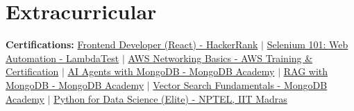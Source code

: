 \documentclass[letterpaper,11pt]{article}
\begin{document}
  \section{Extracurricular}
  \begin{itemize}[leftmargin=0.15in, label={}]
\small{
  \item \textbf{Certifications:} \href{PLACEHOLDER_LINK_1}{Frontend Developer (React) - HackerRank} $|$ \href{PLACEHOLDER_LINK_2}{Selenium 101: Web Automation - LambdaTest} $|$ \href{PLACEHOLDER_LINK_3}{AWS Networking Basics - AWS Training \& Certification} $|$ \href{PLACEHOLDER_LINK_4}{AI Agents with MongoDB - MongoDB Academy} $|$ \href{PLACEHOLDER_LINK_5}{RAG with MongoDB - MongoDB Academy} $|$ \href{PLACEHOLDER_LINK_6}{Vector Search Fundamentals - MongoDB Academy} $|$ \href{PLACEHOLDER_LINK_7}{Python for Data Science (Elite) - NPTEL, IIT Madras}
}
  \end{itemize}
\end{document}
